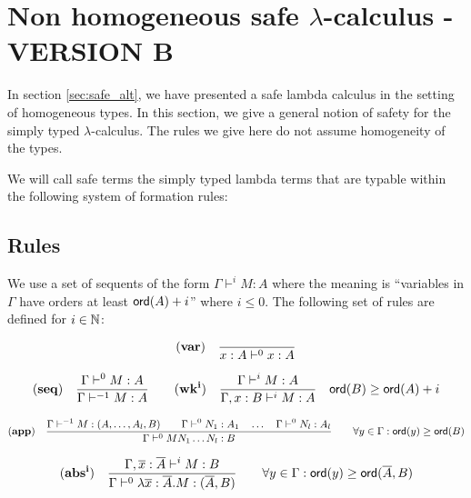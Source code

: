 \clearpage

\section{Non homogeneous safe $\lambda$-calculus - VERSION B}

In section \ref{sec:safe_alt}, we have presented a safe lambda
calculus in the setting of homogeneous types. In this section, we
give a general notion of safety for the simply typed
$\lambda$-calculus. The rules we give here do not assume homogeneity
of the types.

We will call safe terms the simply typed lambda terms that are
typable within the following system of formation rules:

\subsection{Rules}

 We use a set of sequents of the form $\Gamma \vdash^{i} M :
A$ where the meaning is ``variables in $\Gamma$ have orders at least
${\sf ord}(A)+i$'' where $i \leq 0$. The following set of rules are
defined for $i \in \mathbb{N}$:

$$ \mathbf{(var)} \quad  \frac{\displaystyle }{x : A\vdash^{0} x : A} $$

$$ \mathbf{(seq)} \quad \frac{\displaystyle \Gamma \vdash^0 M : A}{\Gamma \vdash^{-1} M : A}
\qquad  \mathbf{(wk^i)} \quad  \frac{\displaystyle \Gamma \vdash^i M : A}{\Gamma , x : B \vdash^i M : A} \quad {\sf ord}(B) \geq {\sf ord}(A) + i $$

$$ \mathbf{(app)} \quad  \frac{\displaystyle \Gamma \vdash^{-1} M : (A,\ldots,A_l,B)
                                        \qquad \Gamma \vdash^{0} N_1 : A_1
                                        \quad \ldots \quad \Gamma \vdash^{0} N_l : A_l  }{\Gamma  \vdash^0 M N_1 \ldots N_l : B}
                                    \qquad
                                   \forall y \in \Gamma : {\sf ord}(y) \geq {\sf ord}(B)$$

$$ \mathbf{(abs^i)} \quad  \frac{\displaystyle \Gamma, \overline{x} : \overline{A} \vdash^{i} M : B}{\Gamma  \vdash^{0} \lambda \overline{x} : \overline{A} . M : (\overline{A},B)} \qquad
                                   \forall y \in \Gamma : {\sf ord}(y) \geq {\sf ord}(\overline{A},B)$$



